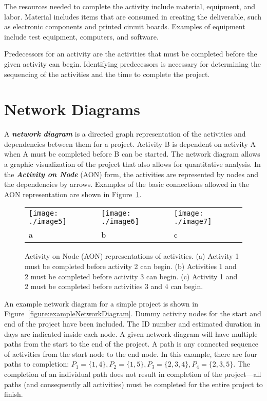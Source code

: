The resources needed to complete the activity include material,
equipment, and labor. Material includes items that are consumed in
creating the deliverable, such as electronic components and printed
circuit boards. Examples of equipment include test equipment, computers,
and software.

Predecessors for an activity are the activities that must be completed
before the given activity can begin. Identifying predecessors is
necessary for determining the sequencing of the activities and the time
to complete the project.

\section{Network Diagrams}
\label{section:network-diagrams}

A \emph{\textbf{network diagram}} is a directed graph representation of
the activities and dependencies between them for a project. Activity B
is dependent on activity A when A must be completed before B can be
started. The network diagram allows a graphic visualization of the
project that also allows for quantitative analysis. In the
\emph{\textbf{Activity on Node}} (AON) form, the activities are
represented by nodes and the dependencies by arrows. Examples of the
basic connections allowed in the AON representation are shown in 
Figure~\ref{figure:activityOnNode}.


\begin{figure}[h]
\begin{tabular}{m{5cm}m{5cm}m{5cm}}
\texttt{[image: ./image5]} &
\texttt{[image: ./image6]} & 
\texttt{[image: ./image7]} \\
a & b & c \\
\end{tabular}

\caption{Activity on Node (AON) representations of
activities. (a) Activity 1 must be completed before activity 2 can
begin. (b) Activities 1 and 2 must be completed before activity 3 can
begin. (c) Activity 1 and 2 must be completed before activities 3 and 4
can begin.}
\label{figure:activityOnNode}
\end{figure}


An example network diagram for a simple project is shown in 
Figure~\ref{figure:exampleNetworkDiagram}.
Dummy activity nodes for the start and end of the project have been
included. The ID number and estimated duration in days are indicated
inside each node. A given network diagram will have multiple paths from
the start to the end of the project. A path is any connected sequence of
activities from the start node to the end node. In this example, there
are four paths to completion:
$P_1 = \{1,4\} , P_2 = \{1,5\}, P_3 = \{2,3,4\}, P_4 = \{2,3,5\}$.
The completion of an individual path does not result in completion of
the project---all paths (and consequently all activities) must be
completed for the entire project to finish.

